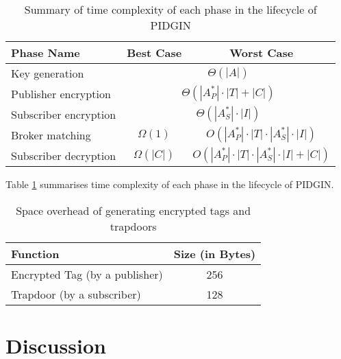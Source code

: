 \documentclass[epsfig,a4paper,11pt,titlepage]{book}
\numberwithin{algorithm}{chapter}
\begin{document}
\begin{table} [htp]
\centering
\caption[Time complexity of each phase in the lifecycle of PIDGIN]{Summary of time complexity of each phase in the lifecycle of \gls{PIDGIN}}
\label{tab:pidgin-complexity-summary}
\begin{tabular}{ |l|c|c| } 

\hline

\textbf{Phase Name} & \textbf{Best Case} & \textbf{Worst Case} \\ \hline

Key generation & \multicolumn{2}{c|}{${\Theta}(| A |)$} \\ \hline

Publisher encryption & \multicolumn{2}{c|}{${\Theta}(|A_P^*| \cdot |T| + |C|)$} \\ \hline

Subscriber encryption & \multicolumn{2}{c|}{${\Theta}(|A_S^*| \cdot |I|)$} \\ \hline

Broker matching & ${\Omega}(1)$ & $O(|A_P^*| \cdot |T| \cdot |A_S^*| \cdot |I|)$ \\ \hline

Subscriber decryption & ${\Omega}(|C|)$ & $O(|A_P^*| \cdot |T| \cdot |A_S^*| \cdot |I| + |C|)$ \\ \hline

\end{tabular}
\end{table}

Table \ref{tab:pidgin-complexity-summary} summarises time complexity of each phase in the lifecycle of \gls{PIDGIN}.

\begin{table} [htp]
\centering
\caption{Space overhead of generating encrypted tags and trapdoors}
\label{tab:pidgin-storage}
\begin{tabular}{ |l|c| }
\hline
\textbf{Function} & \textbf{Size (in Bytes)} \\ \hline
Encrypted Tag (by a publisher) & 256 \\ \hline
Trapdoor (by a subscriber) & 128 \\ \hline
\end{tabular}
\end{table}

\section{Discussion}
\label{sec:pidgin-discussion}
\end{document}
